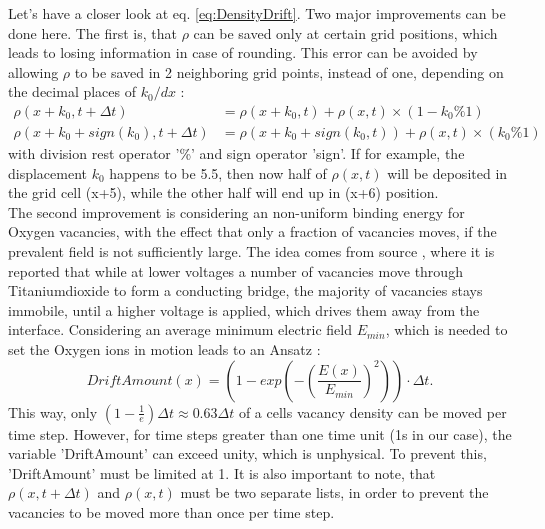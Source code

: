 \documentclass[12pt]{article}
\begin{document}
		Let's have a closer look at eq. \ref{eq:DensityDrift}. Two major improvements can be done here. The first is, that $\rho$ can be saved only at certain grid positions, which leads to losing information in case of rounding. This error can be avoided by allowing $\rho$ to be saved in 2 neighboring grid points, instead of one, depending on the decimal places of $k_0/dx$ :
		\begin{align*}
		\rho(x + k_0, t + \Delta t) &= \rho(x + k_0, t) + \rho(x, t) \times (1 - k_0\% 1)										\\
		\rho(x + k_0 + sign(k_0), t + \Delta t) &= \rho(x + k_0 + sign(k_0, t)) + \rho(x, t) \times (k_0\% 1)
		\end{align*}
		with division rest operator '\%' and sign operator 'sign'. If for example, the displacement $k_0$ happens to be 5.5, then now half of $\rho(x, t)$ will be deposited in the grid cell (x+5), while the other half will end up in (x+6) position. \\
		The second improvement is considering an non-uniform binding energy for Oxygen vacancies, with the effect that only a fraction of vacancies moves, if the prevalent field is not sufficiently large. The idea comes from source \cite{Effect}, where it is reported that while at lower voltages a number of vacancies move through Titaniumdioxide to form a conducting bridge, the majority of vacancies stays immobile, until a higher voltage is applied, which drives them away from the interface.
		Considering an average minimum electric field $E_{min}$, which is needed to set the Oxygen ions in motion leads to an Ansatz :
		\begin{equation}
		DriftAmount(x) = \left(1 - exp\left(-(\frac{E(x)}{E_{min}})^2\right)\right) \cdot \Delta t.
		\end{equation}
		This way, only \((1-\frac{1}{e})\Delta t \approx 0.63 \Delta t \) of a cells vacancy density can be moved per time step.
		However, for time steps greater than one time unit (1s in our case), the variable 'DriftAmount' can exceed unity, which is unphysical. To prevent this, 'DriftAmount' must be limited at 1.
		It is also important to note, that $\rho(x, t + \Delta t)$ and $\rho(x, t)$ must be two separate lists, in order to prevent the vacancies to be moved more than once per time step.
	
\end{document}
